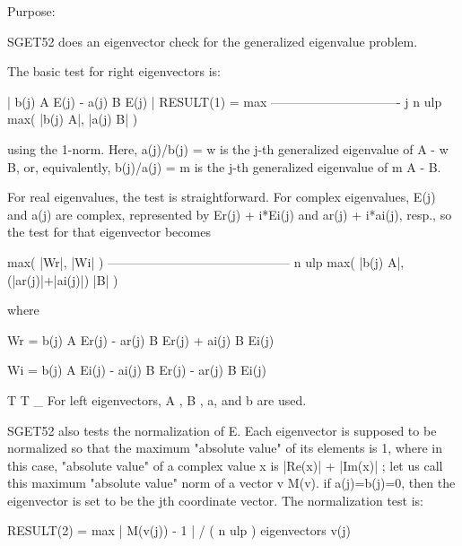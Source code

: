 \begin{DoxyParagraph}{Purpose\+: }
\begin{DoxyVerb} SGET52  does an eigenvector check for the generalized eigenvalue
 problem.

 The basic test for right eigenvectors is:

                           | b(j) A E(j) -  a(j) B E(j) |
         RESULT(1) = max   -------------------------------
                      j    n ulp max( |b(j) A|, |a(j) B| )

 using the 1-norm.  Here, a(j)/b(j) = w is the j-th generalized
 eigenvalue of A - w B, or, equivalently, b(j)/a(j) = m is the j-th
 generalized eigenvalue of m A - B.

 For real eigenvalues, the test is straightforward.  For complex
 eigenvalues, E(j) and a(j) are complex, represented by
 Er(j) + i*Ei(j) and ar(j) + i*ai(j), resp., so the test for that
 eigenvector becomes

                 max( |Wr|, |Wi| )
     --------------------------------------------
     n ulp max( |b(j) A|, (|ar(j)|+|ai(j)|) |B| )

 where

     Wr = b(j) A Er(j) - ar(j) B Er(j) + ai(j) B Ei(j)

     Wi = b(j) A Ei(j) - ai(j) B Er(j) - ar(j) B Ei(j)

                         T   T  _
 For left eigenvectors, A , B , a, and b  are used.

 SGET52 also tests the normalization of E.  Each eigenvector is
 supposed to be normalized so that the maximum "absolute value"
 of its elements is 1, where in this case, "absolute value"
 of a complex value x is  |Re(x)| + |Im(x)| ; let us call this
 maximum "absolute value" norm of a vector v  M(v). 
 if a(j)=b(j)=0, then the eigenvector is set to be the jth coordinate
 vector.  The normalization test is:

         RESULT(2) =      max       | M(v(j)) - 1 | / ( n ulp )
                    eigenvectors v(j)\end{DoxyVerb}
 
\end{DoxyParagraph}

